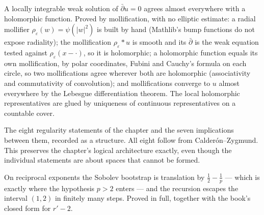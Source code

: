 \begin{lemma}
  \label{lem:12.1.1w}
  \leanok
  A locally integrable weak solution of $\bar\partial u = 0$ agrees almost
  everywhere with a holomorphic function.  Proved by mollification, with no
  elliptic estimate: a radial mollifier $\rho_\varepsilon(w) = \psi(|w|^2)$ is
  built by hand (Mathlib's bump functions do not expose radiality); the
  mollification $\rho_\varepsilon * u$ is smooth and its $\bar\partial$ is the
  weak equation tested against $\rho_\varepsilon(x-\cdot)$, so it is
  holomorphic; a holomorphic function equals its own mollification, by polar
  coordinates, Fubini and Cauchy's formula on each circle, so two
  mollifications agree wherever both are holomorphic (associativity and
  commutativity of convolution); and mollifications converge to $u$ almost
  everywhere by the Lebesgue differentiation theorem.  The local holomorphic
  representatives are glued by uniqueness of continuous representatives on a
  countable cover.
\end{lemma}

\begin{definition}
  \label{def:12.1.c}
  \leanok
  The eight regularity statements of the chapter and the seven implications
  between them, recorded as a structure.  All eight follow from
  Calder\'on--Zygmund.  This preserves the chapter's logical architecture exactly,
  even though the individual statements are about spaces that cannot be formed.
\end{definition}

\begin{proposition}
  \label{prop:12.4}
  \leanok
  On reciprocal exponents the Sobolev bootstrap is translation by
  $\tfrac12 - \tfrac1p$ --- which is exactly where the hypothesis $p > 2$ enters
  --- and the recursion escapes the interval $(1,2)$ in finitely many steps.
  Proved in full, together with the book's closed form for $r' - 2$.
\end{proposition}

